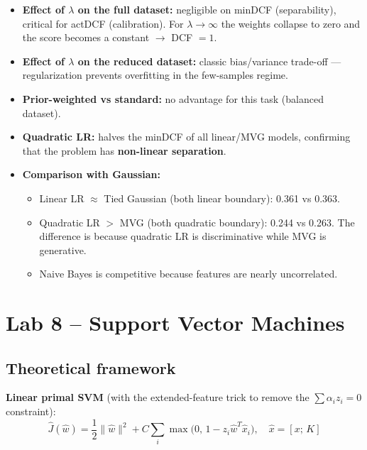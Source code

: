 \documentclass[11pt,a4paper]{article}
\begin{document}
\begin{itemize}
\item \textbf{Effect of $\lambda$ on the full dataset:} negligible on
      minDCF (separability), critical for actDCF (calibration).
      For $\lambda \rightarrow \infty$ the weights collapse to zero
      and the score becomes a constant $\rightarrow$ DCF $= 1$.

\item \textbf{Effect of $\lambda$ on the reduced dataset:} classic
      bias/variance trade-off --- regularization prevents overfitting
      in the few-samples regime.

\item \textbf{Prior-weighted vs standard:} no advantage for this task
      (balanced dataset).

\item \textbf{Quadratic LR:} halves the minDCF of all linear/MVG
      models, confirming that the problem has \textbf{non-linear
      separation}.

\item \textbf{Comparison with Gaussian:}
      \begin{itemize}
      \item Linear LR $\approx$ Tied Gaussian (both linear boundary):
            0.361 vs 0.363.
      \item Quadratic LR $>$ MVG (both quadratic boundary):
            0.244 vs 0.263. The difference is because quadratic LR is
            discriminative while MVG is generative.
      \item Naive Bayes is competitive because features are nearly
            uncorrelated.
      \end{itemize}
\end{itemize}

\section{Lab 8 -- Support Vector Machines}\label{sec:lab8}

\subsection{Theoretical framework}

\textbf{Linear primal SVM} (with the extended-feature trick to remove
the $\sum \alpha_i z_i = 0$ constraint):
\[
\hat{J}(\hat{w}) = \frac{1}{2}\|\hat{w}\|^2
                 + C \sum_{i} \max\bigl(0,\,1 - z_i \hat{w}^T \hat{x}_i\bigr),
\quad \hat{x} = [x;\,K]
\]
\end{document}

